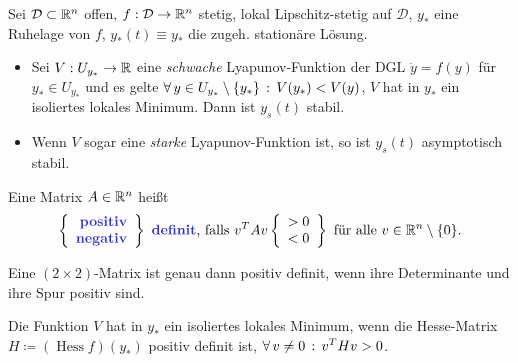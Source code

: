 \documentclass{cheat-sheet}
\newcommand{\D}{\mathcal{D}}
\DeclareMathOperator{\Hess}{Hess} %
\begin{document}
\begin{satz}
  Sei $\D \subset \R^n$ offen, $f : \D \to \R^n$ stetig, lokal Lipschitz-stetig auf $\D$, $y_{*}$ eine Ruhelage von $f$, $y_{*}(t) \equiv y_{*}$ die zugeh. stationäre Lösung.
  \begin{itemize}
    \item Sei $V : U_{y_{*}} \to \mathbb{R}$ eine \textit{schwache} Lyapunov-Funktion der DGL $\dot{y} = f(y)$ für $y_{*} \in U_{y_{*}}$ und es gelte $\forall \, {y \in U_{y_{*}} \setminus \{ y_{*} \}} \,:\, V(y_{*}) < V(y)$, \dh{} $V$ hat in $y_{*}$ ein isoliertes lokales Minimum. Dann ist $y_s(t)$ stabil.
    \item Wenn $V$ sogar eine \textit{starke} Lyapunov-Funktion ist, so ist $y_s(t)$ asymptotisch stabil.
  \end{itemize}
\end{satz}

\begin{defn}
  Eine Matrix $A \in \mathbb{R}^n$ heißt
  \[
    \left\{ \begin{array}{rlll}
      \text{\emph{positiv}} \\
      \text{\emph{negativ}}
    \end{array} \right\}
    \text{ \emph{definit}, falls }
    v^T A v
    \left\{ \begin{array}{rlll}
      > 0 \\
      < 0
    \end{array} \right\}
    \text{ für alle }
    v \in \R^n \setminus \{ 0 \}.
  \]
\end{defn}

\begin{bem}
  Eine $(2 \times 2)$-Matrix ist genau dann positiv definit, wenn ihre Determinante und ihre Spur positiv sind.
\end{bem}

\begin{bem}
  Die Funktion $V$ hat in $y_{*}$ ein isoliertes lokales Minimum, wenn die Hesse-Matrix $H \coloneqq (\Hess f)(y_{*})$ positiv definit ist, \dh{} $\forall \, {v \not= 0} \,:\, v^T H v > 0$.
\end{bem}



\end{document}
